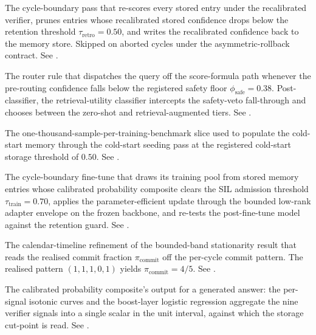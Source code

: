 \begin{description}[style=nextline, leftmargin=0pt, labelindent=0pt, itemsep=6pt, parsep=0pt, font=\bfseries, beginpenalty=10000]
\item[Retroactive re-verification.]\nopagebreak[4] The cycle-boundary pass that re-scores every stored entry under the recalibrated verifier, prunes entries whose recalibrated stored confidence drops below the retention threshold $\tau_{\text{retro}} = 0.50$, and writes the recalibrated confidence back to the memory store. Skipped on aborted cycles under the asymmetric-rollback contract. See .

\item[Safety override.] The router rule that dispatches the query off the score-formula path whenever the pre-routing confidence falls below the registered safety floor $\phi_{\text{safe}} = 0.38$. Post-classifier, the retrieval-utility classifier intercepts the safety-veto fall-through and chooses between the zero-shot and retrieval-augmented tiers. See .

\item[Seed pool.] The one-thousand-sample-per-training-benchmark slice used to populate the cold-start memory through the cold-start seeding pass at the registered cold-start storage threshold of $0.50$. See .

\item[Self-improvement loop.]\nopagebreak[4] The cycle-boundary fine-tune that draws its training pool from stored memory entries whose calibrated probability composite clears the SIL admission threshold $\tau_{\text{train}} = 0.70$, applies the parameter-efficient update through the bounded low-rank adapter envelope on the frozen backbone, and re-tests the post-fine-tune model against the retention guard. See .

\item[Stochastic equilibrium.] The calendar-timeline refinement of the bounded-band stationarity result that reads the realised commit fraction $\pi_{\mathrm{commit}}$ off the per-cycle commit pattern. The realised pattern $(1, 1, 1, 0, 1)$ yields $\pi_{\mathrm{commit}} = 4/5$. See .

\item[Stored confidence (\boldmath$u_{\text{stored}}$).] The calibrated probability composite's output for a generated answer: the per-signal isotonic curves and the boost-layer logistic regression aggregate the nine verifier signals into a single scalar in the unit interval, against which the storage cut-point is read. See .


\end{description}
